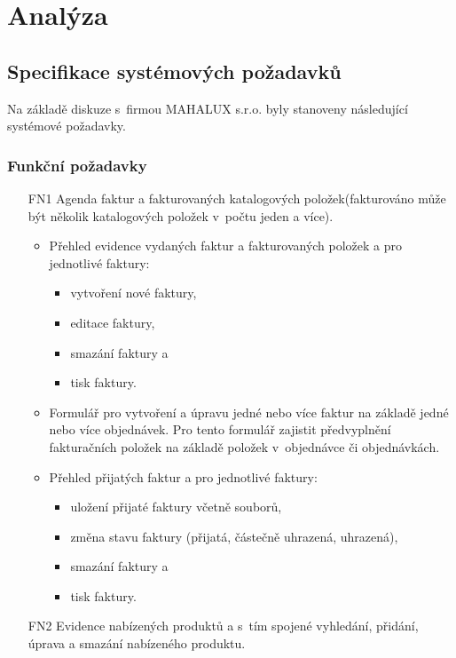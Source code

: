 \documentclass[thesis=B,czech]{FITthesis}[2012/06/26]
\begin{document}
\chapter{Analýza}

\section{Specifikace systémových požadavků}

	Na základě diskuze s~firmou MAHALUX s.r.o. byly stanoveny následující systémové požadavky.
	
\subsection{Funkční požadavky}

\begin{enumerate}
	\item[FN1] Agenda faktur a fakturovaných katalogových položek(fakturováno může být několik katalogových položek v~počtu jeden a více).
	\begin{itemize}
		\item Přehled evidence vydaných faktur a fakturovaných položek a pro jednotlivé faktury:
		\begin{itemize}
			\item vytvoření nové faktury,
			\item editace faktury,
			\item smazání faktury a
			\item tisk faktury.
		\end{itemize}
		\item Formulář pro vytvoření a úpravu jedné nebo více faktur na základě jedné nebo více objednávek. Pro tento formulář zajistit předvyplnění fakturačních položek na základě položek v~objednávce či objednávkách.
		\item Přehled přijatých faktur a pro jednotlivé faktury:
		\begin{itemize}
			\item uložení přijaté faktury včetně souborů,
			\item změna stavu faktury (přijatá, částečně uhrazená, uhrazená),
			\item smazání faktury a
			\item tisk faktury.
		\end{itemize}
	\end{itemize}	
	\item[FN2] Evidence nabízených produktů a s~tím spojené
	 	vyhledání, přidání, úprava a smazání nabízeného produktu.

\end{enumerate}
\end{document}
